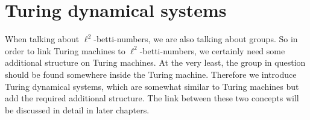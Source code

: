 \section{Turing dynamical systems} \label{tds}

When talking about $\ell^2$-betti-numbers, we are also talking about groups.
So in order to link Turing machines to $\ell^2$-betti-numbers, we certainly need some additional structure on Turing machines.
At the very least, the group in question should be found somewhere inside the Turing machine.
Therefore we introduce Turing dynamical systems, which are somewhat similar to Turing machines but add the required additional structure.
The link between these two concepts will be discussed in detail in later chapters.









